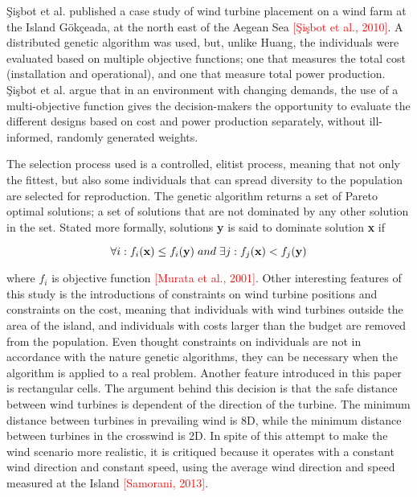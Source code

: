 \noindent \c{S}i\c{s}bot et al. published a case study of wind turbine placement on a wind farm at the Island G{\"o}k\c{c}eada, at the north east of the Aegean Sea \textcolor{red}{[\c{S}i\c{s}bot et al., 2010]}. A distributed genetic algorithm was used, but, unlike Huang, the individuals were evaluated based on multiple objective functions; one that measures the total cost (installation and operational), and one that measure total power production. \c{S}i\c{s}bot et al. argue that in an environment with changing demands, the use of a multi-objective function gives the decision-makers the opportunity to evaluate the different designs based on cost and power production separately, without ill-informed, randomly generated weights.

The selection process used is a controlled, elitist process, meaning that not only the fittest, but also some individuals that can spread diversity to the population are selected for reproduction. The genetic algorithm returns a set of Pareto optimal solutions; a set of solutions that are not dominated by any other solution in the set. Stated more formally, solutions \textbf{y} is said to dominate solution \textbf{x} if

\begin{equation}
\forall i: f_i(\textbf{x}) \leq f_i(\textbf{y}) \hspace{1mm} and \hspace{1mm} \exists j: f_j(\textbf{x}) < f_j(\textbf{y}) 
\label{Dominated solutions}
\end{equation}

where $f_i$ is objective function \textcolor{red}{[Murata et al., 2001]}. Other interesting features of this study is the introductions of constraints on wind turbine positions and constraints on the cost, meaning that individuals with wind turbines outside the area of the island, and individuals with costs larger than the budget are removed from the population. Even thought constraints on individuals are not in accordance with the nature genetic algorithms, they can be necessary when the algorithm is applied to a real problem. Another feature introduced in this paper is rectangular cells. The argument behind this decision is that the safe distance between wind turbines is dependent of the direction of the turbine. The minimum distance between turbines in prevailing wind is 8D, while the minimum distance between turbines in the crosswind is 2D. In spite of this attempt to make the wind scenario more realistic, it is critiqued because it operates with a constant wind direction and constant speed, using the average wind direction and speed measured at the Island \textcolor{red}{[Samorani, 2013]}. \\